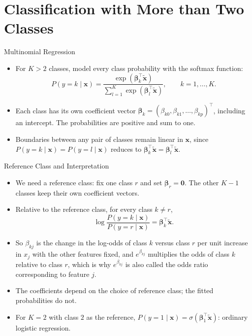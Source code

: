\section{Classification with More than Two Classes}


\begin{frame}{Multinomial Regression}
    \begin{itemize}
        \item For $K > 2$ classes, model every class probability with the softmax function:
        \[
            P(y = k \mid \mathbf{x}) = \frac{\exp(\symbf{\beta}_k^\top \tilde{\mathbf{x}})}{\sum_{l=1}^{K} \exp(\symbf{\beta}_l^\top \tilde{\mathbf{x}})}, \qquad k = 1, \dots, K.
        \]
        \item Each class has its own coefficient vector $\symbf{\beta}_k = (\beta_{k0}, \beta_{k1}, \dots, \beta_{kp})^\top$, including an intercept. The probabilities are positive and sum to one.
        \item Boundaries between any pair of classes remain linear in $\mathbf{x}$, since $P(y = k \mid \mathbf{x}) = P(y = l \mid \mathbf{x})$ reduces to $\symbf{\beta}_k^\top \tilde{\mathbf{x}} = \symbf{\beta}_l^\top \tilde{\mathbf{x}}$.
    \end{itemize}
\end{frame}


\begin{frame}{Reference Class and Interpretation}
    \begin{itemize}
        \item We need a reference class: fix one class $r$ and set $\symbf{\beta}_r = \mathbf{0}$. The other $K - 1$ classes keep their own coefficient vectors.
        \item Relative to the reference class, for every class $k \neq r$,
        \[
            \log \frac{P(y = k \mid \mathbf{x})}{P(y = r \mid \mathbf{x})} = \symbf{\beta}_k^\top \tilde{\mathbf{x}}.
        \]
        \item So $\beta_{kj}$ is the change in the log-odds of class $k$ versus class $r$ per unit increase in $x_j$ with the other features fixed, and $e^{\beta_{kj}}$ multiplies the odds of class $k$ relative to class $r$, which is why $e^{\beta_{kj}}$ is also called the odds ratio corresponding to feature $j$.
        \item The coefficients depend on the choice of reference class; the fitted probabilities do not.
        \item For $K = 2$ with class $2$ as the reference, $P(y = 1 \mid \mathbf{x}) = \sigma(\symbf{\beta}_1^\top \tilde{\mathbf{x}})$: ordinary logistic regression.
    \end{itemize}
\end{frame}


